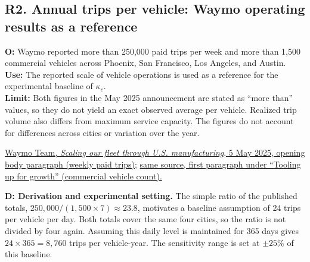 \documentclass[10pt,a4paper]{article}
\begin{document}
\subsection*{\hypertarget{rationale-R2}{R2. Annual trips per vehicle: Waymo operating results as a reference}}

\noindent
\textbf{O:}
Waymo reported more than 250,000 paid trips per week and more than 1,500 commercial vehicles across Phoenix, San Francisco, Los Angeles, and Austin. \\
\textbf{Use:}
The reported scale of vehicle operations is used as a reference for the experimental baseline of $\kappa_c$. \\
\textbf{Limit:}
Both figures in the May 2025 announcement are stated as ``more than'' values, so they do not yield an exact observed average per vehicle. Realized trip volume also differs from maximum service capacity. The figures do not account for differences across cities or variation over the year.

\medskip
\noindent
\href{https://waymo.com/blog/2025/05/scaling-our-fleet-through-us-manufacturing/#:~:text=more\%20than\%20250\%2C000\%20paid\%20trips\%20each\%20week}
{Waymo Team, \textit{Scaling our fleet through U.S. manufacturing}, 5 May 2025, opening body paragraph (weekly paid trips)};
\href{https://waymo.com/blog/2025/05/scaling-our-fleet-through-us-manufacturing/#:~:text=over\%201\%2C500\%20vehicles}
{same source, first paragraph under ``Tooling up for growth'' (commercial vehicle count).}

\medskip
\noindent
\textbf{D: Derivation and experimental setting.}
The simple ratio of the published totals,
$250{,}000/(1{,}500\times7)\approx23.8$, motivates a baseline assumption of 24 trips per vehicle per day. Both totals cover the same four cities, so the ratio is not divided by four again. Assuming this daily level is maintained for 365 days gives $24\times365=8{,}760$ trips per vehicle-year. The sensitivity range is set at $\pm25\%$ of this baseline.
\end{document}
